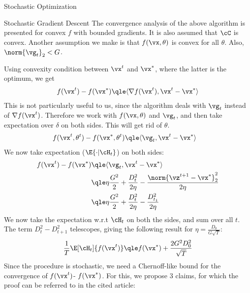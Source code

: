 \documentclass{article}
\begin{document}
\begin{psection}{Stochastic Optimization}
\begin{psubsection}{Stochastic Gradient Descent}
		The convergence analysis of the above algorithm is presented for convex $f$ with bounded gradients. It is also assumed that $\cC$ is convex. Another assumption we make is that $f(\vx,\theta)$ is convex for all $\theta$. Also, $\norm{\vg_t}_2<G$.

		Using convexity condition between $\vx^t$ and $\vx^*$, where the latter is the optimum, we get
		\begin{equation*}
			\begin{split}
				f(\vx^t)-f(\vx^*) &\qle \langle\nabla f(\vx^t),\vx^t-\vx^*\rangle \\
			\end{split}
		\end{equation*}
		This is not particularly useful to us, since the algorithm deals with $\vg_t$ instead of $\nabla f(\vx^t)$. Therefore we work with $f(\vx,\theta)$ and $\vg_t$, and then take expectation over $\delta$ on both sides. This will get rid of $\theta$.
		\begin{equation*}
			\begin{aligned}
				f(\vx^t,\theta^t)-f(\vx^*,\theta^t) &\qle \langle\vg_t,\vx^t-\vx^*\rangle
			\end{aligned}
		\end{equation*}
		We now take expectation ($\E{\cdot\vert\cH_t}$) on both sides:
		\begin{equation*}
			\begin{aligned}
				f(\vx^t)-f(\vx^*) &\qle \langle\vg_t,\vx^t-\vx^*\rangle \\
				&\qle \eta \frac{G^2}{2} + \frac{D_t^2}{2\eta}-\frac{\norm{\vz^{t+1}-\vx^*}_2^2}{2\eta}\\
				&\qle \eta \frac{G^2}{2} + \frac{D_t^2}{2\eta}-\frac{D_{t_1}^2}{2\eta}
			\end{aligned}
		\end{equation*}
		We now take the expectation w.r.t $\cH_t$ on both the sides, and sum over all $t$. The term $D_t^2-D_{t+1}^2$ telescopes, giving the following result for $\eta=\frac{D_0}{G\sqrt{T}}$:
		\begin{equation*}
			\begin{aligned}
				\frac{1}{T}\E[\cH_t]{f(\vx^t)}\qle f(\vx^*) + \frac{2G^2D_0^2}{\sqrt{T}}
			\end{aligned}
		\end{equation*}
		Since the procedure is stochastic, we need a Chernoff-like bound for the convergence of $f(\vx^t)$- $f(\vx^*)$. For this, we propose 3 claims, for which the proof can be referred to in the cited article:


\end{psubsection}
\end{psection}
\end{document}
